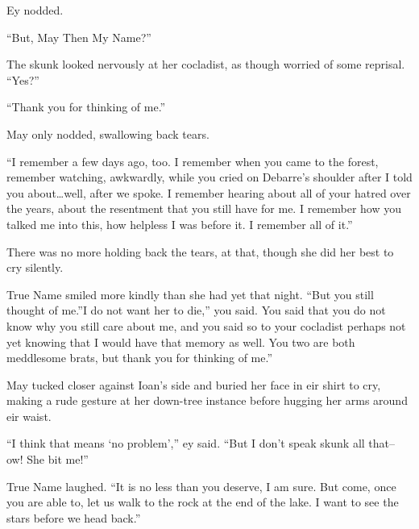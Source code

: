 Ey nodded.

``But, May Then My Name?''

The skunk looked nervously at her cocladist, as though worried of some reprisal. ``Yes?''

``Thank you for thinking of me.''

May only nodded, swallowing back tears.

``I remember a few days ago, too. I remember when you came to the forest, remember watching, awkwardly, while you cried on Debarre's shoulder after I told you about\ldots well, after we spoke. I remember hearing about all of your hatred over the years, about the resentment that you still have for me. I remember how you talked me into this, how helpless I was before it. I remember all of it.''

There was no more holding back the tears, at that, though she did her best to cry silently.

True Name smiled more kindly than she had yet that night. ``But you still thought of me.''I do not want her to die,'' you said. You said that you do not know why you still care about me, and you said so to your cocladist perhaps not yet knowing that I would have that memory as well. You two are both meddlesome brats, but thank you for thinking of me.''

May tucked closer against Ioan's side and buried her face in eir shirt to cry, making a rude gesture at her down-tree instance before hugging her arms around eir waist.

``I think that means `no problem','' ey said. ``But I don't speak skunk all that-- ow! She bit me!''

True Name laughed. ``It is no less than you deserve, I am sure. But come, once you are able to, let us walk to the rock at the end of the lake. I want to see the stars before we head back.''
